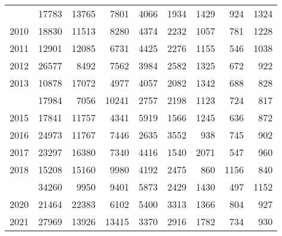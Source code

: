 \documentclass[
]{article}
\begin{document}
\begin{longtable}[t]{lrrrrrrrr}
\addlinespace
2009 & 17783 & 13765 & 7801 & 4066 & 1934 & 1429 & 924 & 1324\\
2010 & 18830 & 11513 & 8280 & 4374 & 2232 & 1057 & 781 & 1228\\
2011 & 12901 & 12085 & 6731 & 4425 & 2276 & 1155 & 546 & 1038\\
2012 & 26577 & 8492 & 7562 & 3984 & 2582 & 1325 & 672 & 922\\
2013 & 10878 & 17072 & 4977 & 4057 & 2082 & 1342 & 688 & 828\\
\addlinespace
2014 & 17984 & 7056 & 10241 & 2757 & 2198 & 1123 & 724 & 817\\
2015 & 17841 & 11757 & 4341 & 5919 & 1566 & 1245 & 636 & 872\\
2016 & 24973 & 11767 & 7446 & 2635 & 3552 & 938 & 745 & 902\\
2017 & 23297 & 16380 & 7340 & 4416 & 1540 & 2071 & 547 & 960\\
2018 & 15208 & 15160 & 9980 & 4192 & 2475 & 860 & 1156 & 840\\
\addlinespace
2019 & 34260 & 9950 & 9401 & 5873 & 2429 & 1430 & 497 & 1152\\
2020 & 21464 & 22383 & 6102 & 5400 & 3313 & 1366 & 804 & 927\\
2021 & 27969 & 13926 & 13415 & 3370 & 2916 & 1782 & 734 & 930\\*
\end{longtable}
\end{document}
